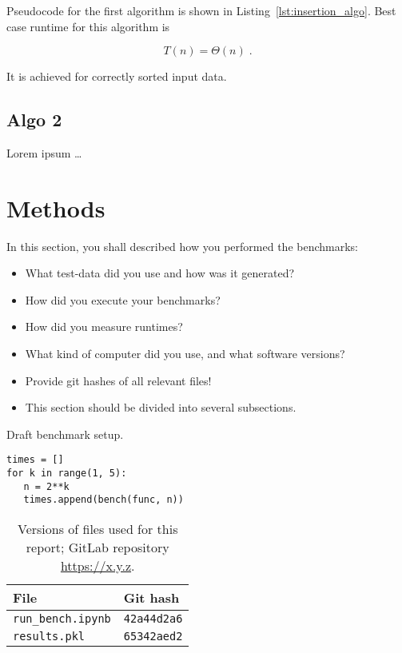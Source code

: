 \documentclass[sigconf, nonacm, screen, balance=False]{acmart}
\begin{document}
Pseudocode for the first algorithm is shown in
Listing~\ref{lst:insertion_algo}. Best case runtime for this algorithm
is

\begin{equation}
  T(n) = \Theta(n) \;.  \label{eq:ins_sort_best}
\end{equation}

It is achieved for correctly sorted input data.

\subsection{Algo 2}\label{sec:algo2}

Lorem ipsum \dots


\section{Methods}\label{sec:methods}

In this section, you shall described how you performed the
benchmarks:
\begin{itemize}
\item What test-data did you use and how was it generated?
\item How did you execute your benchmarks?
\item How did you measure runtimes?
\item What kind of computer did you use, and what software versions?
\item Provide git hashes of all relevant files!
\item This section should be divided into several subsections.
\end{itemize}

\begin{listing}
  \caption{Draft benchmark setup.}
  \label{lst:bench_setup}
  \begin{lstlisting}
times = []
for k in range(1, 5):
   n = 2**k
   times.append(bench(func, n))
  \end{lstlisting}
\end{listing}

\begin{table}
  \caption{Versions of files used for this report; GitLab repository
    \url{https://x.y.z}.}
  \label{tab:hashes}
  \begin{tabular}{ll}
    \hline
    File & Git hash \\\hline
    \verb!run_bench.ipynb! & \verb!42a44d2a6! \\
    \verb!results.pkl! & \verb!65342aed2! \\\hline
  \end{tabular}
\end{table}
\end{document}
